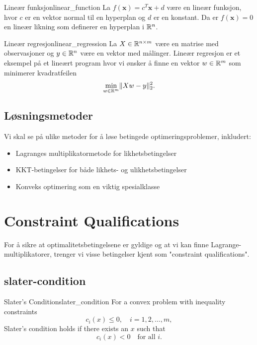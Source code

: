 \begin{example}{Lineær funksjon}{linear_function}
	La \(f(\symbf{x}) = c^T\symbf{x} + d\) være en lineær funksjon, hvor \(c\) er en vektor normal til en hyperplan og \(d\) er en konstant.
	Da er \(f(\symbf{x}) = 0\) en lineær likning som definerer en hyperplan i \(\mathbb{R}^n\).
\end{example}

\begin{example}{Lineær regresjon}{linear_regression}
	La \(X \in \mathbb{R}^{n \times m}\) være en matrise med observasjoner og \(y \in \mathbb{R}^n\) være en vektor med målinger.
	Lineær regresjon er et eksempel på et lineært program hvor vi ønsker å finne en vektor \(w \in \mathbb{R}^m\) som minimerer kvadratfeilen
	\begin{equation*}
		\min_{w \in \mathbb{R}^m} \lVert Xw - y\rVert_2^2.
	\end{equation*}
\end{example}

\section{Løsningsmetoder}

Vi skal se på ulike metoder for å løse betingede optimeringsproblemer, inkludert:
\begin{itemize}
	\item Lagranges multiplikatormetode for likhetsbetingelser
	\item KKT-betingelser for både likhets- og ulikhetsbetingelser
	\item Konveks optimering som en viktig spesialklasse
\end{itemize}

\chapter{Constraint Qualifications}

For å sikre at optimalitetsbetingelsene er gyldige og at vi kan finne Lagrange-multiplikatorer, trenger vi visse betingelser kjent som "constraint qualifications".

\section[Slaters betingelse]{\gls{slater-condition}}

\begin{definition}{Slater's Condition}{slater_condition}
	For a convex problem with inequality constraints
	\[
		c_i(x) \le 0,\quad i=1,2,\dots,m,
	\]
	Slater's condition holds if there exists an \(x\) such that
	\[
		c_i(x) < 0 \quad \text{for all } i.
	\]
\end{definition}

